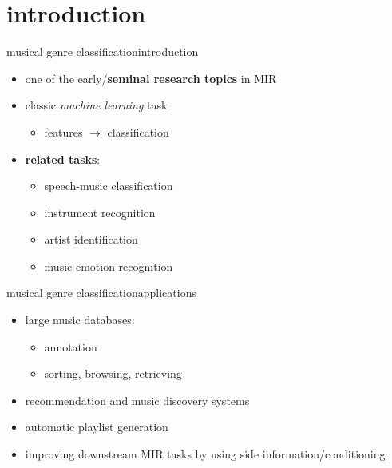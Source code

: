     \section[intro]{introduction}
        \begin{frame}{musical genre classification}{introduction}
            \begin{itemize}
                \item	one of the early/\textbf{seminal research topics} in MIR
                \bigskip
                \item<2->	classic \textit{machine learning }task
                    \begin{itemize}
                        \item   features $\rightarrow$ classification
                    \end{itemize}
                \bigskip
                \item<3->	\textbf{related tasks}:
                    \begin{itemize}
                        \item	speech-music classification
                        \item	instrument recognition
                        \item   artist identification
                        \item   music emotion recognition
                    \end{itemize}
            \end{itemize}
        \end{frame}

        \begin{frame}{musical genre classification}{applications}
            \begin{itemize}
                \item	large music databases:
                    \begin{itemize}
                        \item	annotation
                        \item	sorting, browsing, retrieving
                    \end{itemize}
                \bigskip
                \pause
                \item   recommendation and music discovery systems
                \item	automatic playlist generation
                \item	improving downstream MIR tasks by using side information/conditioning
            \end{itemize}
        \end{frame}

